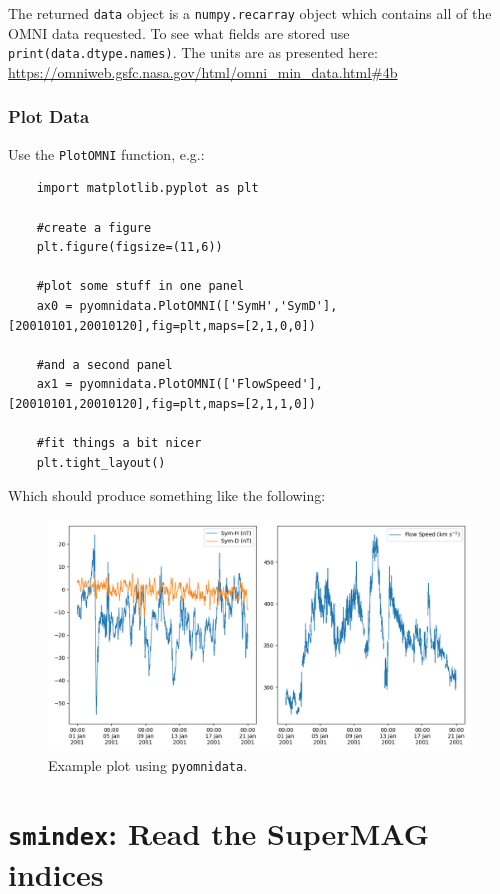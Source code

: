 	The returned \texttt{data} object is a \texttt{numpy.recarray} object which contains all of the OMNI data requested. To see what fields are stored use \texttt{print(data.dtype.names)}. The units are as presented here: \url{https://omniweb.gsfc.nasa.gov/html/omni_min_data.html#4b}
	
	\subsubsection{Plot Data}
	
	Use the \texttt{PlotOMNI} function, e.g.:
	
	\begin{verbatim}
	import matplotlib.pyplot as plt
	
	#create a figure
	plt.figure(figsize=(11,6))
	
	#plot some stuff in one panel
	ax0 = pyomnidata.PlotOMNI(['SymH','SymD'],[20010101,20010120],fig=plt,maps=[2,1,0,0])
	
	#and a second panel
	ax1 = pyomnidata.PlotOMNI(['FlowSpeed'],[20010101,20010120],fig=plt,maps=[2,1,1,0])
	
	#fit things a bit nicer
	plt.tight_layout()
	\end{verbatim}
	
	Which should produce something like the following:
	
	\begin{figure}[H]
	  \centering
	  \includegraphics[width=\textwidth]{figures/ch5_omniexample.png}
	  \caption{Example plot using \texttt{pyomnidata}.}
	\end{figure}
	

	


	\section{\texttt{smindex}: Read the SuperMAG indices}


